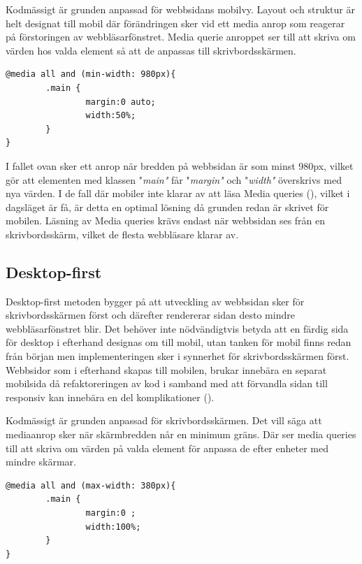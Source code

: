 \documentclass[11pt]{article}
\begin{document}
Kodmässigt är grunden anpassad för webbsidans mobilvy. Layout och struktur är helt designat till mobil där förändringen sker vid ett media anrop som reagerar på förstoringen av webbläsarfönstret. Media querie anroppet ser till att skriva om värden hos valda element så att de anpassas till skrivbordsskärmen.
 
\vspace{0.5cm}
 \begin{verbatim}
@media all and (min-width: 980px){
        .main {
                margin:0 auto;
                width:50%;
        }
}
\end{verbatim}

\vspace{0.5cm}
I fallet ovan sker ett anrop när bredden på webbsidan är som minst 980px, vilket gör att elementen med klassen "\textit{main"} får "\textit{margin"} och "\textit{width"} överskrivs med nya värden. I de fall där mobiler inte klarar av att läsa Media queries (\cite{adaptiveresp}), vilket i dagsläget är få, är detta en optimal lösning då grunden redan är skrivet för mobilen. Läsning av Media queries krävs endast när webbsidan ses från en skrivbordsskärm, vilket de flesta webbläsare klarar av.

\subsection{Desktop-first}
Desktop-first metoden bygger på att utveckling av webbsidan sker för skrivbordsskärmen först och därefter rendererar sidan desto mindre webbläsarfönstret blir. Det behöver inte nödvändigtvis betyda att en färdig sida för desktop i efterhand designas om till mobil, utan tanken för mobil finns redan från början men implementeringen sker i synnerhet för skrivbordsskärmen först. Webbsidor som i efterhand skapas till mobilen, brukar innebära en separat mobilsida då refaktoreringen av kod i samband med att förvandla sidan till responsiv kan innebära en del komplikationer (\cite{adaptiveresp}).  

Kodmässigt är grunden anpassad för skrivbordsskärmen. Det vill säga att mediaanrop sker när skärmbredden når en minimum gräns. Där ser media queries till att skriva om värden på valda element för anpassa de efter enheter med mindre skärmar.


\vspace{0.5cm}
 \begin{verbatim}
@media all and (max-width: 380px){
        .main {
                margin:0 ;
                width:100%;
        }
}
\end{verbatim}
\vspace{0.5cm}
\end{document}
